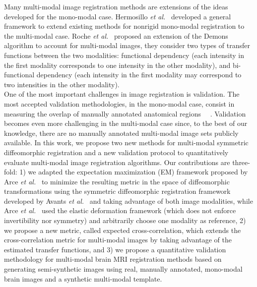 Many multi-modal image registration methods are extensions of the ideas developed for the mono-modal case. Hermosillo {\it et al.}~\cite{Hermosillo2004} developed a general framework to extend existing methods for nonrigid mono-modal registration to the multi-modal case. Roche {\it et al.}~\cite{Roche2004a} proposed an extension of the Demons algorithm to account for multi-modal images, they consider two types of transfer functions between the two modalities: functional dependency (each intensity in the first modality corresponds to one intensity in the other modality), and bi-functional dependency (each intensity in the first modality may correspond to two intensities in the other modality).\\


One of the most important challenges in image registration is validation. The most accepted validation methodologies, in the mono-modal case, consist in measuring the overlap of manually annotated anatomical regions \cite{Klein2009}~\cite{Klein2010}~\cite{Rohlfing2012}. Validation becomes even more challenging in the multi-modal case since, to the best of our knowledge, there are no manually annotated multi-modal image sets publicly available. In this work, we propose two new methods for multi-modal symmetric diffeomorphic registration and a new validation protocol to quantitatively evaluate multi-modal image registration algorithms. Our contributions are three-fold: 1) we adapted the expectation maximization (EM) framework proposed by Arce {\it et al.}~\cite{Arce-santana2014} to minimize the resulting metric in the space of diffeomorphic transformations using the symmetric diffeomorphic registration framework developed by Avants {\it et al.}~\cite{Avants2008} \cite{Avants2011} and taking advantage of both image modalities, while Arce {\it et al.}~\cite{Arce-santana2014} used the elastic deformation framework (which does not enforce invertibility nor symmetry) and arbitrarily choose one modality as reference, 2) we propose a new metric, called expected cross-correlation, which extends the cross-correlation metric for multi-modal images by taking advantage of the estimated transfer functions, and 3) we propose a quantitative validation methodology for multi-modal brain MRI registration methods based on generating semi-synthetic images using real, manually annotated, mono-modal brain images and a synthetic multi-modal template.\\
